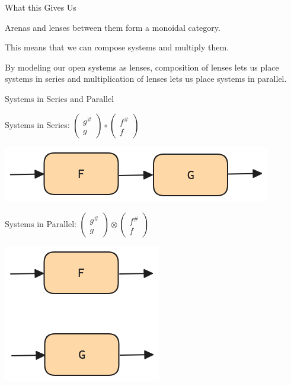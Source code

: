 \documentclass{beamer}
\begin{document}
\begin{frame}{What this Gives Us}
    \begin{large}
        Arenas and lenses between them form a monoidal category.

        \vspace*{0.125in}
        This means that we can compose systems and multiply them.

        \vspace*{0.125in}
        By modeling our open systems as lenses, composition of lenses lets us place systems in series and multiplication of lenses lets us place systems in parallel.

    \end{large}

\end{frame}


\begin{frame}{Systems in Series and Parallel}
    \begin{center}
        \begin{large}
            Systems in Series:
            $\begin{pmatrix}g^\# \\ g\end{pmatrix} \circ \begin{pmatrix}f^\# \\ f\end{pmatrix}$

            \includegraphics[scale=0.25]{Systems_Series.png}

            \vspace*{0.25in}
            Systems in Parallel:
            $\begin{pmatrix}g^\# \\ g\end{pmatrix} \otimes \begin{pmatrix}f^\# \\ f\end{pmatrix}$

            \includegraphics[scale=0.25]{Systems_Parallel.png}
        \end{large}
    \end{center}




\end{frame}
\end{document}

